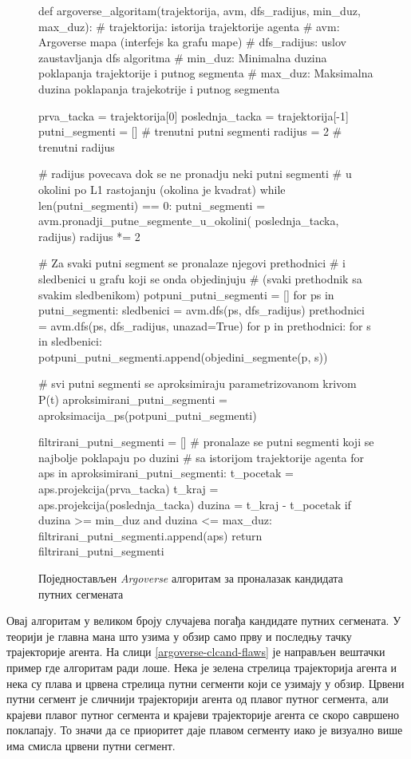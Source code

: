 \documentclass[11pt,oneside]{memoir}
\begin{document}
\begin{figure}
\begin{python}
def argoverse_algoritam(trajektorija, avm, dfs_radijus, min_duz, max_duz):
  # trajektorija: istorija trajektorije agenta 
  # avm: Argoverse mapa (interfejs ka grafu mape)
  # dfs_radijus: uslov zaustavljanja dfs algoritma
  # min_duz: Minimalna duzina poklapanja trajektorije i putnog segmenta
  # max_duz: Maksimalna duzina poklapanja trajekotrije i putnog segmenta

  prva_tacka = trajektorija[0]
  poslednja_tacka = trajektorija[-1]
  putni_segmenti = []  # trenutni putni segmenti
  radijus = 2  # trenutni radijus

  # radijus povecava dok se ne pronadju neki putni segmenti 
  # u okolini po L1 rastojanju (okolina je kvadrat)
  while len(putni_segmenti) == 0:
    putni_segmenti = avm.pronadji_putne_segmente_u_okolini(
      poslednja_tacka, radijus)
    radijus *= 2

  # Za svaki putni segment se pronalaze njegovi prethodnici
  # i sledbenici u grafu koji se onda objedinjuju 
  # (svaki prethodnik sa svakim sledbenikom)
  potpuni_putni_segmenti = []
  for ps in putni_segmenti:
    sledbenici = avm.dfs(ps, dfs_radijus)
    prethodnici = avm.dfs(ps, dfs_radijus, unazad=True)
    for p in prethodnici:
      for s in sledbenici:
        potpuni_putni_segmenti.append(objedini_segmente(p, s))

  # svi putni segmenti se aproksimiraju parametrizovanom krivom P(t)
  aproksimirani_putni_segmenti = aproksimacija_ps(potpuni_putni_segmenti)

  filtrirani_putni_segmenti = []
  # pronalaze se putni segmenti koji se najbolje poklapaju po duzini
  # sa istorijom trajektorije agenta
  for aps in aproksimirani_putni_segmenti:
    t_pocetak = aps.projekcija(prva_tacka)
    t_kraj = aps.projekcija(poslednja_tacka)
    duzina = t_kraj - t_pocetak
    if duzina >= min_duz and duzina <= max_duz:
      filtrirani_putni_segmenti.append(aps)
  return filtrirani_putni_segmenti
\end{python}
\caption{Поједностављен \textit{Argoverse} алгоритам за проналазак кандидата путних сегмената\label{argoverse-clcand}}
\end{figure}

Овај алгоритам у великом броју случајева погађа кандидате путних сегмената. У теорији је главна мана што узима у обзир само прву и последњу
тачку трајекторије агента. На слици \ref{argoverse-clcand-flaws} је направљен вештачки пример где алгоритам ради лоше. Нека је зелена стрелица
трајекторија агента и нека су плава и црвена стрелица путни сегменти који се узимају у обзир. Црвени путни сегмент је сличнији
трајекторији агента од плавог путног сегмента, али крајеви плавог путног сегмента и крајеви трајекторије агента се скоро савршено поклапају. 
То значи да се приоритет даје плавом сегменту иако је визуално више има смисла црвени путни сегмент.
\end{document}
